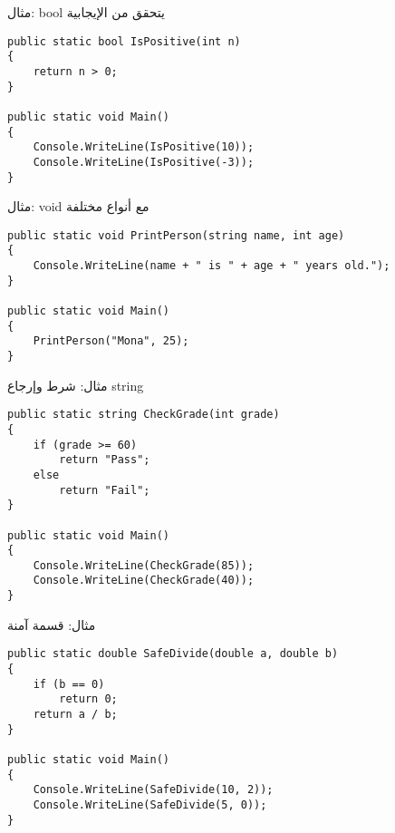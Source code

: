 \documentclass[13pt]{beamer}
\begin{document}
\begin{frame}[fragile]{مثال: bool يتحقق من الإيجابية}
\begin{english}
\begin{lstlisting}[language=CSharp]
public static bool IsPositive(int n)
{
    return n > 0;
}

public static void Main()
{
    Console.WriteLine(IsPositive(10));
    Console.WriteLine(IsPositive(-3));
}
\end{lstlisting}
\end{english}
\end{frame}

\begin{frame}[fragile]{مثال: void مع أنواع مختلفة}
\begin{english}
\begin{lstlisting}[language=CSharp]
public static void PrintPerson(string name, int age)
{
    Console.WriteLine(name + " is " + age + " years old.");
}

public static void Main()
{
    PrintPerson("Mona", 25);
}
\end{lstlisting}
\end{english}
\end{frame}

\begin{frame}[fragile]{مثال: شرط وإرجاع string}
\begin{english}
\begin{lstlisting}[language=CSharp]
public static string CheckGrade(int grade)
{
    if (grade >= 60)
        return "Pass";
    else
        return "Fail";
}

public static void Main()
{
    Console.WriteLine(CheckGrade(85));
    Console.WriteLine(CheckGrade(40));
}
\end{lstlisting}
\end{english}
\end{frame}

\begin{frame}[fragile]{مثال: قسمة آمنة}
\begin{english}
\begin{lstlisting}[language=CSharp]
public static double SafeDivide(double a, double b)
{
    if (b == 0)
        return 0;
    return a / b;
}

public static void Main()
{
    Console.WriteLine(SafeDivide(10, 2));
    Console.WriteLine(SafeDivide(5, 0));
}
\end{lstlisting}
\end{english}
\end{frame}
\end{document}
